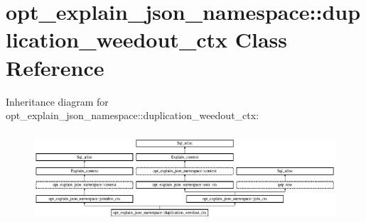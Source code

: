 \hypertarget{classopt__explain__json__namespace_1_1duplication__weedout__ctx}{}\section{opt\+\_\+explain\+\_\+json\+\_\+namespace\+:\+:duplication\+\_\+weedout\+\_\+ctx Class Reference}
\label{classopt__explain__json__namespace_1_1duplication__weedout__ctx}
Inheritance diagram for opt\+\_\+explain\+\_\+json\+\_\+namespace\+:\+:duplication\+\_\+weedout\+\_\+ctx\+:\begin{figure}[H]
\begin{center}
\leavevmode
\includegraphics[height=3.404255cm]{classopt__explain__json__namespace_1_1duplication__weedout__ctx}
\end{center}
\end{figure}
